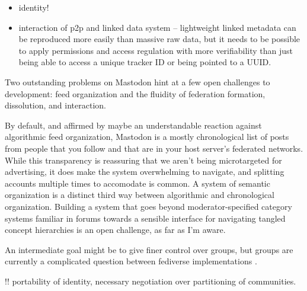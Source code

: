\documentclass[10pt]{tufte-book}
\begin{document}
\begin{itemize}

\item
  identity!
\item
  interaction of p2p and linked data system -- lightweight linked
  metadata can be reproduced more easily than massive raw data, but it
  needs to be possible to apply permissions and access regulation with
  more verifiability than just being able to access a unique tracker ID
  or being pointed to a UUID.
\end{itemize}

Two outstanding problems on Mastodon hint at a few open challenges to
development: feed organization and the fluidity of federation formation,
dissolution, and interaction.

By default, and affirmed by maybe an understandable reaction against
algorithmic feed organization, Mastodon is a mostly chronological list
of posts from people that you follow and that are in your host server's
federated networks. While this transparency is reassuring that we aren't
being microtargeted for advertising, it does make the system
overwhelming to navigate, and splitting accounts multiple times to
accomodate is common. A system of semantic organization is a distinct
third way between algorithmic and chronological organization. Building a
system that goes beyond moderator-specified category systems familiar in
forums towards a sensible interface for navigating tangled concept
hierarchies is an open challenge, as far as I'm aware.

An intermediate goal might be to give finer control over groups, but
groups are currently a complicated question between fediverse
implementations \citep{StandardizingActivityPubGroups2021} .

!! portability of identity, necessary negotiation over partitioning of
communities. 

\backmatter
 
 
\end{document}
